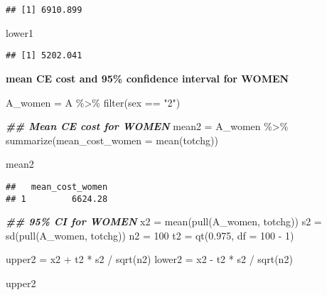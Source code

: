 \documentclass[
]{article}
\newenvironment{Shaded}{\begin{snugshade}}{\end{snugshade}}
\newcommand{\AttributeTok}[1]{\textcolor[rgb]{0.77,0.63,0.00}{#1}}
\newcommand{\DecValTok}[1]{\textcolor[rgb]{0.00,0.00,0.81}{#1}}
\newcommand{\DocumentationTok}[1]{\textcolor[rgb]{0.56,0.35,0.01}{\textbf{\textit{#1}}}}
\newcommand{\FloatTok}[1]{\textcolor[rgb]{0.00,0.00,0.81}{#1}}
\newcommand{\FunctionTok}[1]{\textcolor[rgb]{0.00,0.00,0.00}{#1}}
\newcommand{\NormalTok}[1]{#1}
\newcommand{\OtherTok}[1]{\textcolor[rgb]{0.56,0.35,0.01}{#1}}
\newcommand{\SpecialCharTok}[1]{\textcolor[rgb]{0.00,0.00,0.00}{#1}}
\newcommand{\StringTok}[1]{\textcolor[rgb]{0.31,0.60,0.02}{#1}}
\begin{document}
\begin{verbatim}
## [1] 6910.899
\end{verbatim}

\begin{Shaded}
\begin{Highlighting}[]
\NormalTok{lower1}
\end{Highlighting}
\end{Shaded}

\begin{verbatim}
## [1] 5202.041
\end{verbatim}

\textbf{mean CE cost and 95\% confidence interval for WOMEN}

\begin{Shaded}
\begin{Highlighting}[]
\NormalTok{A\_women }\OtherTok{=} 
\NormalTok{A }\SpecialCharTok{\%\textgreater{}\%} 
  \FunctionTok{filter}\NormalTok{(sex }\SpecialCharTok{==} \StringTok{"2"}\NormalTok{)}

\DocumentationTok{\#\# Mean CE cost for WOMEN}
\NormalTok{mean2 }\OtherTok{=} 
\NormalTok{A\_women }\SpecialCharTok{\%\textgreater{}\%} 
  \FunctionTok{summarize}\NormalTok{(}\AttributeTok{mean\_cost\_women =} \FunctionTok{mean}\NormalTok{(totchg)) }

\NormalTok{mean2}
\end{Highlighting}
\end{Shaded}

\begin{verbatim}
##   mean_cost_women
## 1         6624.28
\end{verbatim}

\begin{Shaded}
\begin{Highlighting}[]
\DocumentationTok{\#\# 95\% CI for WOMEN}
\NormalTok{x2 }\OtherTok{=} \FunctionTok{mean}\NormalTok{(}\FunctionTok{pull}\NormalTok{(A\_women, totchg))}
\NormalTok{s2 }\OtherTok{=} \FunctionTok{sd}\NormalTok{(}\FunctionTok{pull}\NormalTok{(A\_women, totchg))}
\NormalTok{n2 }\OtherTok{=} \DecValTok{100}
\NormalTok{t2 }\OtherTok{=} \FunctionTok{qt}\NormalTok{(}\FloatTok{0.975}\NormalTok{, }\AttributeTok{df =} \DecValTok{100} \SpecialCharTok{{-}} \DecValTok{1}\NormalTok{)}

\NormalTok{upper2 }\OtherTok{=}\NormalTok{ x2 }\SpecialCharTok{+}\NormalTok{ t2 }\SpecialCharTok{*}\NormalTok{ s2 }\SpecialCharTok{/} \FunctionTok{sqrt}\NormalTok{(n2)}
\NormalTok{lower2 }\OtherTok{=}\NormalTok{ x2 }\SpecialCharTok{{-}}\NormalTok{ t2 }\SpecialCharTok{*}\NormalTok{ s2 }\SpecialCharTok{/} \FunctionTok{sqrt}\NormalTok{(n2)}

\NormalTok{upper2}
\end{Highlighting}
\end{Shaded}
\end{document}
